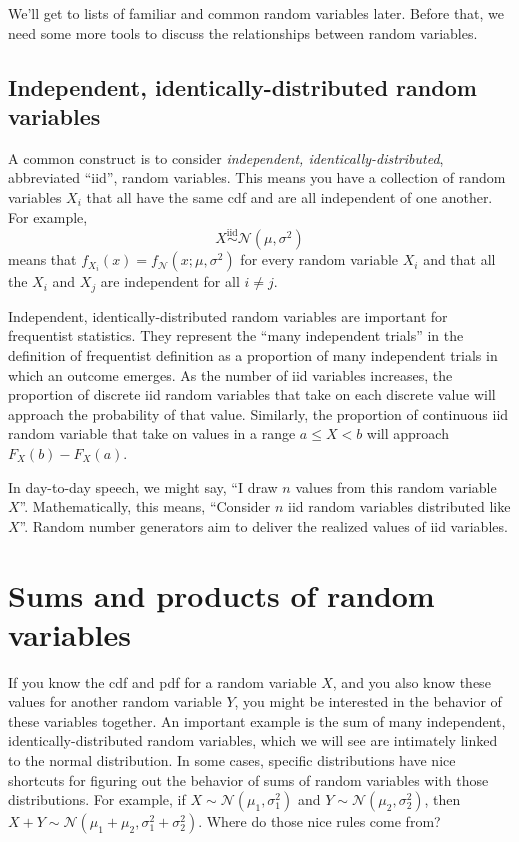 We'll get to lists of familiar and common random variables later. Before that,
we need some more tools to discuss the relationships between random variables.

\subsection{Independent, identically-distributed random variables}

A common construct is to consider \emph{independent, identically-distributed},
abbreviated ``iid'', random variables. This means you have a collection of
random variables $X_i$ that all have the same cdf and are all independent of
one another. For example,
\begin{equation*}
X \stackrel{\text{iid}}{\sim} \mathcal{N}(\mu, \sigma^2)
\end{equation*}
means that $f_{X_i}(x) = f_\mathcal{N}(x; \mu, \sigma^2)$ for every random variable
$X_i$ and that all the $X_i$ and $X_j$ are independent for all $i \neq j$.

Independent, identically-distributed random variables are important for
frequentist statistics. They represent the ``many independent trials''
in the definition of frequentist definition as a proportion of many
independent trials in which an outcome emerges. As the number of iid variables
increases, the proportion of discrete iid random variables that take on each
discrete value will approach the probability of that value. Similarly, the
proportion of continuous iid random variable that take on values in a range $a
\leq X < b$ will approach $F_X(b) - F_X(a)$.

In day-to-day speech, we might say, ``I draw $n$ values from this random
variable $X$''. Mathematically, this means, ``Consider $n$ iid random
variables distributed like $X$''. Random number generators  aim to deliver the
realized values of iid variables.


\section{Sums and products of random variables}

If you know the cdf and pdf for a random variable $X$, and you also know these
values for another random variable $Y$, you might be interested in the
behavior of these variables together. An important example is the sum of many
independent, identically-distributed random variables, which we will see are
intimately linked to the normal distribution. In some cases, specific distributions have
nice shortcuts for figuring out the behavior of sums of random variables with
those distributions. For example, if $X \sim \mathcal{N}(\mu_1, \sigma_1^2)$
and $Y \sim \mathcal{N}(\mu_2, \sigma_2^2)$, then $X + Y \sim
\mathcal{N}(\mu_1 + \mu_2, \sigma_1^2 + \sigma_2^2)$. Where do those nice
rules come from?

